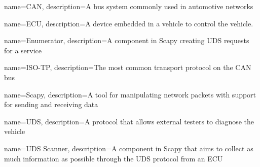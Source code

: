 {
    name=CAN,
    description={A bus system commonly used in automotive networks}
}

{
    name=ECU,
    description={A device embedded in a vehicle to control the vehicle.}
}

{
    name=Enumerator,
    description={A component in Scapy creating UDS requests for a service}
}

{
    name=ISO-TP,
    description={The most common transport protocol on the CAN bus}
}

{
    name=Scapy,
    description={A tool for manipulating network packets with support for sending and receiving data}
}

{
    name=UDS,
    description={A protocol that allows external testers to diagnose the vehicle}
}

{
    name=UDS Scanner,
    description={A component in Scapy that aims to collect as much information as possible through the UDS protocol from an ECU}
}